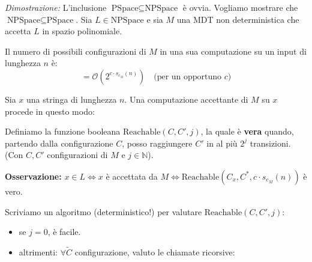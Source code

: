 \textit{Dimostrazione:}
L'inclusione $\text{PSpace} \subseteq \text{NPSpace}$ è ovvia. Vogliamo mostrare che $\text{NPSpace} \subseteq \text{PSpace}$. 
Sia $L \in \text{NPSpace}$ e sia $M$ una MDT non deterministica che accetta $L$ in spazio polinomiale.

Il numero di possibili configurazioni di $M$ in una sua computazione su un input di lunghezza $n$ è:
$$ = \mathcal{O}\left(2^{c \cdot s_{c_M}(n)}\right) \quad \text{(per un opportuno } c \text{)} $$

Sia $x$ una stringa di lunghezza $n$. Una computazione accettante di $M$ su $x$ procede in questo modo:
\begin{center}
\end{center}

Definiamo la funzione booleana $\text{Reachable}(C, C', j)$, la quale è \textbf{vera} quando, partendo dalla configurazione $C$, posso raggiungere $C'$ in al più $2^j$ transizioni. 
(Con $C, C'$ configurazioni di $M$ e $j \in \mathbb{N}$).

\textbf{Osservazione:} $x \in L \iff x$ è accettata da $M \iff \text{Reachable}(C_x, C^*, c \cdot s_{c_M}(n))$ è vero.

Scriviamo un algoritmo (deterministico!) per valutare $\text{Reachable}(C, C', j)$:
\begin{itemize}
    \item se $j = 0$, è facile.
    \item altrimenti: $\forall \tilde{C}$ configurazione, valuto le chiamate ricorsive:
\end{itemize}

